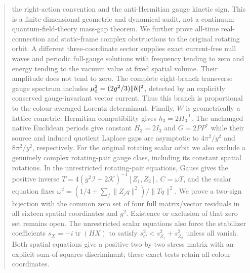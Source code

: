\documentclass[11pt]{article}
\begin{document}
\begin{abstract}
the right-action convention and the anti-Hermitian gauge kinetic sign.
This is a finite-dimensional geometric and dynamical audit, not a
continuum quantum-field-theory mass-gap theorem.
We further prove all-time real-connection and static-frame complex
obstructions to the original rotating orbit. A different three-coordinate
sector supplies exact current-free null waves and periodic full-gauge
solutions with frequency tending to zero and energy tending to the vacuum
value at fixed spatial volume. Their amplitude does not tend to zero.
The complete eight-branch transverse gauge spectrum includes
$\mu_{\rm d}^2=(2g^2/3)\|b\|^2$, detected by an explicitly conserved
gauge-invariant vector current. Thus this branch is proportional to the
colour-averaged Lorentz determinant. Finally, $W$ is geometrically a
lattice cometric: Hermitian compatibility gives $h_3=2H_3^{-1}$.
The unchanged native Euclidean periods give constant $H_3=2I_3$ and
$G=2PP^*$ while their source and induced quotient Laplace gaps are
asymptotic to $4\pi^2/y^2$ and $8\pi^2/y^2$, respectively.
For the original rotating scalar orbit we also exclude a genuinely
complex rotating-pair gauge class, including its constant spatial
rotations. In the unrestricted rotating-pair equations, Gauss gives the
positive inverse $T=4(g^2\mathcal I+2\mathcal K)^{-1}[Z_1,Z_2]$,
$C=\omega T$, and the scalar equation fixes
$\omega^2=(1/4+\sum_j\|Z_jq\|^2)/\|Tq\|^2$.
We prove a two-sign bijection with the common zero set of four full
matrix/vector residuals in all sixteen spatial coordinates and $g^2$.
Existence or exclusion of that zero set remains open.
The unrestricted scalar equations also force the stabilizer coefficients
$s_X=-i\operatorname{tr}(HX)$ to satisfy
$s_C^2<s_{Z_1}^2+s_{Z_2}^2$ unless all vanish. Both spatial equations
give a positive two-by-two stress matrix with an explicit sum-of-squares
discriminant; these exact tests retain all colour coordinates.


\end{abstract}
\end{document}
